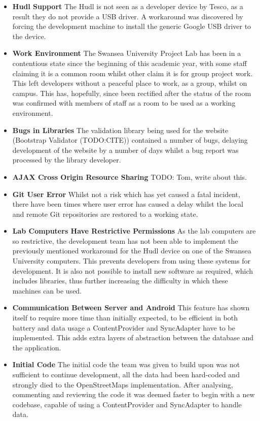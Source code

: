 \documentclass[11pt,a4paper]{article}
\begin{document}
\begin{itemize}
\item\textbf{Hudl Support} The Hudl is not seen as a developer device by Tesco, as a result they do not provide a USB driver. A workaround was discovered by forcing the development machine to install the generic Google USB driver to the device.
\item\textbf{Work Environment} The Swansea University Project Lab has been in a contentious state since the beginning of this academic year, with some staff claiming it is a common room whilst other claim it is for group project work. This left developers without a peaceful place to work, as a group, whilst on campus. This has, hopefully, since been rectified after the status of the room was confirmed with members of staff as a room to be used as a working environment. 
\item\textbf{Bugs in Libraries} The validation library being used for the website (Bootstrap Validator (TODO:CITE)) contained a number of bugs, delaying development of the website by a number of days whilst a bug report was processed by the library developer.
\item\textbf{AJAX Cross Origin Resource Sharing} TODO: Tom, write about this.
\item\textbf{Git User Error} Whilst not a risk which has yet caused a fatal incident, there have been times where user error has caused a delay whilst the local and remote Git repositories are restored to a working state.
\item\textbf{Lab Computers Have Restrictive Permissions} As the lab computers are so restrictive, the development team has not been able to implement the previously mentioned workaround for the Hudl device on one of the Swansea University computers. This prevents developers from using these systems for development. It is also not possible to install new software as required, which includes libraries, thus further increasing the difficulty in which these machines can be used.
\item\textbf{Communication Between Server and Android} This feature has shown itself to require more time than initially expected, to be efficient in both battery and data usage a ContentProvider and SyncAdapter have to be implemented. This adds extra layers of abstraction between the database and the application.
\item\textbf{Initial Code} The initial code the team was given to build upon was not sufficient to continue development, all the data had been hard-coded and strongly died to the OpenStreetMaps implementation. After analysing, commenting and reviewing the code it was deemed faster to begin with a new codebase, capable of using a ContentProvider and SyncAdapter to handle data.
\end{itemize}
\end{document}
